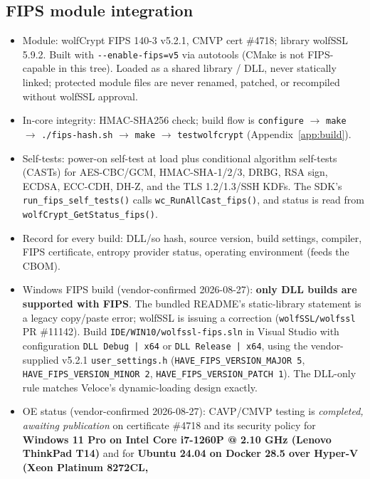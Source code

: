 \documentclass[10pt]{article}
\newcommand{\code}[1]{\texttt{\small #1}}
\begin{document}
\subsection{FIPS module integration}
\begin{itemize}
  \item Module: wolfCrypt FIPS 140-3 v5.2.1, CMVP cert \#4718; library wolfSSL 5.9.2.
        Built with \code{-{}-enable-fips=v5} via autotools (CMake is not FIPS-capable in
        this tree). Loaded as a shared library / DLL, never statically linked; protected
        module files are never renamed, patched, or recompiled without wolfSSL approval.
  \item In-core integrity: HMAC-SHA256 check; build flow is
        \code{configure} $\rightarrow$ \code{make} $\rightarrow$ \code{./fips-hash.sh}
        $\rightarrow$ \code{make} $\rightarrow$ \code{testwolfcrypt} (Appendix~\ref{app:build}).
  \item Self-tests: power-on self-test at load plus conditional algorithm self-tests
        (CASTs) for AES-CBC/GCM, HMAC-SHA-1/2/3, DRBG, RSA sign, ECDSA, ECC-CDH, DH-Z,
        and the TLS 1.2/1.3/SSH KDFs. The SDK's \code{run\_fips\_self\_tests()} calls
        \code{wc\_RunAllCast\_fips()}, and status is read from
        \code{wolfCrypt\_GetStatus\_fips()}.
  \item Record for every build: DLL/so hash, source version, build settings, compiler,
        FIPS certificate, entropy provider status, operating environment (feeds the
        CBOM).
  \item Windows FIPS build (vendor-confirmed 2026-08-27): \textbf{only DLL builds are
        supported with FIPS}. The bundled README's static-library statement is a legacy
        copy/paste error; wolfSSL is issuing a correction
        (\code{wolfSSL/wolfssl} PR \#11142). Build \code{IDE/WIN10/wolfssl-fips.sln} in
        Visual Studio with configuration \code{DLL Debug | x64} or
        \code{DLL Release | x64}, using the vendor-supplied v5.2.1
        \code{user\_settings.h} (\code{HAVE\_FIPS\_VERSION\_MAJOR 5},
        \code{HAVE\_FIPS\_VERSION\_MINOR 2}, \code{HAVE\_FIPS\_VERSION\_PATCH 1}). The
        DLL-only rule matches Veloce's dynamic-loading design exactly.
  \item OE status (vendor-confirmed 2026-08-27): CAVP/CMVP testing is \emph{completed,
        awaiting publication} on certificate \#4718 and its security policy for
        \textbf{Windows 11 Pro on Intel Core i7-1260P @ 2.10 GHz (Lenovo ThinkPad T14)}
        and for \textbf{Ubuntu 24.04 on Docker 28.5 over Hyper-V (Xeon Platinum 8272CL,
}
\end{itemize}
\end{document}
